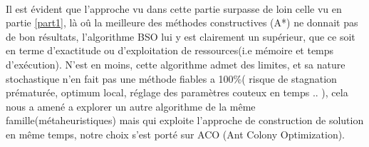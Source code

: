 	\paragraph{}
	Il est évident que l'approche vu dans cette partie surpasse de loin celle vu en partie \ref{part1}, là oû la meilleure des méthodes constructives (A*) ne donnait pas de bon résultats, l'algorithme BSO lui y est clairement un  supérieur, que ce soit en terme d'exactitude ou d'exploitation de ressources(i.e mémoire et temps d'exécution). N'est en moins, cette algorithme admet des limites, et sa nature stochastique n'en fait pas une méthode fiables a 100\%( risque de stagnation prématurée, optimum local, réglage des paramètres couteux en temps .. ), cela nous a amené a explorer un autre algorithme de la même famille(métaheuristiques) mais qui exploite l'approche de construction de solution en même temps, notre choix s'est porté sur ACO (Ant Colony Optimization).
